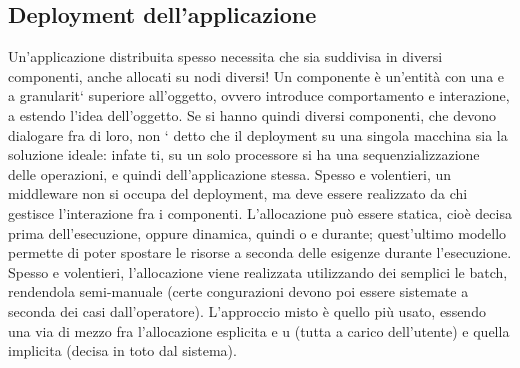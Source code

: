 \documentclass[a4paper,12pt]{article}
\begin{document}
\subsection{Deployment dell'applicazione}

Un'applicazione distribuita spesso necessita che sia suddivisa in diversi componenti, anche allocati su nodi diversi! Un
componente è un'entità con una
e
a
granularit` superiore all'oggetto, ovvero introduce comportamento e interazione,
a
estendo l'idea dell'oggetto.
Se si hanno quindi diversi componenti, che devono dialogare fra di loro, non
` detto che il deployment su una singola macchina sia la soluzione ideale: infate
ti, su un solo processore si ha una sequenzializzazione delle operazioni, e quindi
dell'applicazione stessa.
Spesso e volentieri, un middleware non si occupa del deployment, ma deve
essere realizzato da chi gestisce l'interazione fra i componenti. L'allocazione
può essere statica, cioè decisa prima dell'esecuzione, oppure dinamica, quindi
o
e
durante; quest'ultimo modello permette di poter spostare le risorse a seconda
delle esigenze durante l'esecuzione. Spesso e volentieri, l'allocazione viene realizzata utilizzando dei semplici le
batch, rendendola semi-manuale (certe congurazioni devono poi essere sistemate a seconda dei casi dall'operatore).
L'approccio misto è quello più usato, essendo una via di mezzo fra l'allocazione esplicita
e
u
(tutta a carico dell'utente) e quella implicita (decisa in toto dal sistema).
\end{document}
